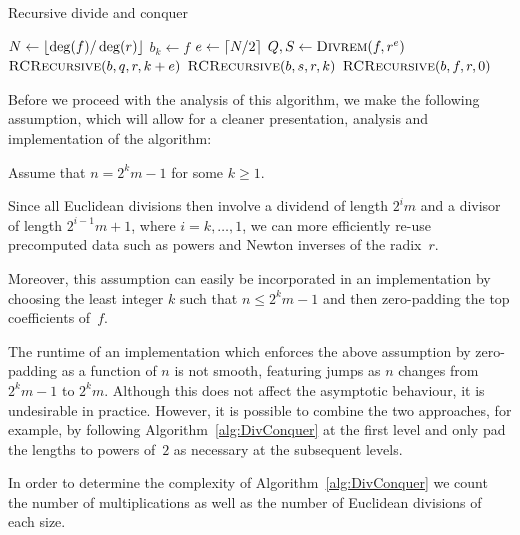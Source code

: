 \begin{algorithm}[H]
\caption{Recursive divide and conquer}
\label{alg:DivConquer}
\begin{algorithmic}
\vspace{1mm}
\State $N \gets \left\lfloor\deg(f) / \deg(r)\right\rfloor$
\State $b_k \gets f$
\Else
\State $e \gets \left\lceil N/2\right\rceil$
\State $Q, S \gets \Call{Divrem}{f, r^{e}}$
\State $\Call{RCRecursive}{b, q, r, k + e}$
\State $\Call{RCRecursive}{b, s, r, k}$
\EndIf
\EndProcedure
{}
\State $\Call{RCRecursive}{b, f, r, 0}$
\EndProcedure
\end{algorithmic}
\end{algorithm}

Before we proceed with the analysis of this algorithm, we make the 
following assumption, which will allow for a cleaner presentation, 
analysis and implementation of the algorithm:
\begin{notation}
Assume that $n = 2^k m - 1$ for some $k \geq 1$.
\end{notation}

\begin{rem}
Since all Euclidean divisions then involve a dividend of 
length $2^{i} m$ and a divisor of length $2^{i-1} m + 1$, 
where $i = k, \dotsc, 1$, we can more efficiently re-use 
precomputed data such as powers and Newton inverses of 
the radix~$r$.

Moreover, this assumption can easily be incorporated in an 
implementation by choosing the least integer $k$ such that 
$n \leq 2^k m - 1$ and then zero-padding the top coefficients 
of~$f$.
\end{rem}

\begin{rem}
The runtime of an implementation which enforces the above 
assumption by zero-padding as a function of $n$ is 
not smooth, featuring jumps as $n$ changes from 
$2^k m - 1$ to $2^k m$.  Although this does not 
affect the asymptotic behaviour, it is undesirable in 
practice.  However, it is possible to combine the two 
approaches, for example, by following Algorithm~\ref{alg:DivConquer} 
at the first level and only pad the lengths to powers of~$2$ 
as necessary at the subsequent levels.
\end{rem}

In order to determine the complexity of Algorithm~\ref{alg:DivConquer} 
we count the number of multiplications as well as the number of 
Euclidean divisions of each size.

